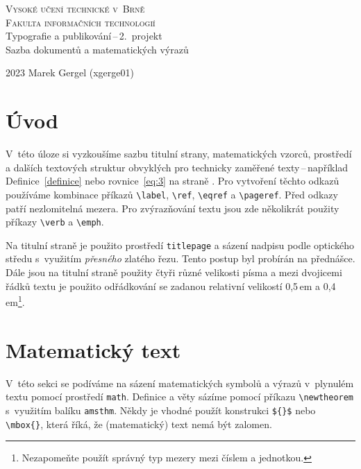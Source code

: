 \documentclass[a4paper, 11pt, twocolumn]{article}
\begin{document}
\newtheorem{definice}{Definice}
\newtheorem{veta}{Věta}

\thispagestyle{empty}
\begin{titlepage}
    \begin{center}
        \textsc{\Huge Vysoké učení technické v~Brně\\[0.5em]
        \huge Fakulta informačních technologií}\\
        {\LARGE Typografie a publikování\,--\,2.\ projekt \\[0.4em]}
        {\LARGE Sazba dokumentů a matematických výrazů}
    \end{center}
    {\Large 2023 \hfill Marek Gergel (xgerge01)}
\end{titlepage}

\section*{Úvod}

V~této úloze si vyzkoušíme sazbu titulní strany, matematických vzorců, prostředí a dalších textových struktur obvyklých pro technicky zaměřené texty\,--\,například Definice~\ref*{definice} nebo rovnice~\eqref{eq:3} na straně \pageref{eq:3}. Pro vytvoření těchto odkazů používáme kombinace příkazů \verb|\label|, \verb|\ref|, \verb|\eqref| a \verb|\pageref|. Před odkazy patří nezlomitelná mezera. Pro zvýrazňování textu jsou zde několikrát použity příkazy \verb|\verb| a \verb|\emph|.
\par Na titulní straně je použito prostředí \verb|titlepage| a sázení nadpisu podle optického středu s~využitím \emph{přesného} zlatého řezu. Tento postup byl probírán na přednášce. Dále jsou na titulní straně použity čtyři různé velikosti písma a mezi dvojicemi řádků textu je použito odřádkování se zadanou relativní velikostí 0,5\,em a 0,4\,em\footnote{Nezapomeňte použít správný typ mezery mezi číslem a jednotkou.}.

\section{Matematický text}

V~této sekci se podíváme na sázení matematických symbolů a výrazů v~plynulém textu pomocí prostředí \verb|math|.  
Definice a věty sázíme pomocí příkazu \verb|\newtheorem| s~využitím balíku \verb|amsthm|. Někdy je vhodné použít konstrukci \verb|${}$| nebo \verb|\mbox{}|, která říká, že (matematický) text nemá být zalomen. 
\end{document}
